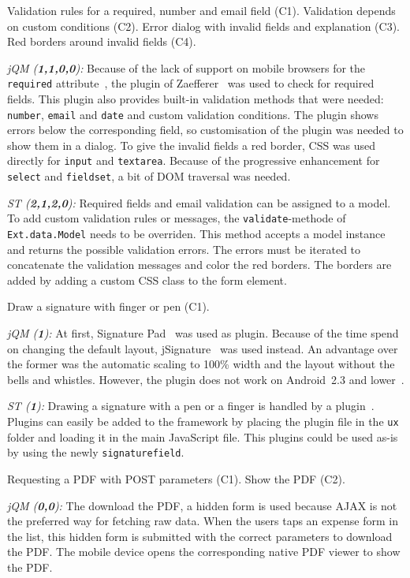 \documentclass[a4paper]{artikel3}
\newcommand{\code}[1]{\texttt{#1}}
\newcommand{\setspace}[0]{\vspace{2mm}}
\renewcommand{\paragraph}[1]{\setspace \noindent {\bf #1}  }
\newcommand{\framework}[2]{ \emph{#1 (\textbf{#2}): }} %
\newcommand{\challenge}[1]{\paragraph{#1}}
\begin{document}
\challenge{Form validation (C1,C2,C3,C4)}
Validation rules for a required, number and email field (C1).
Validation depends on custom conditions (C2).
Error dialog with invalid fields and explanation (C3).
Red borders around invalid fields (C4).

\framework{jQM}{1,1,0,0}
Because of the lack of support on mobile browsers for the \code{required} attribute~\cite{Deveria2013}, the plugin of Zaefferer~\cite{Zaefferer2013} was used to check for required fields.
This plugin also provides built-in validation methods that were needed: \code{number}, \code{email} and \code{date} and custom validation conditions.
The plugin shows errors below the corresponding field, so customisation of the plugin was needed to show them in a dialog.
To give the invalid fields a red border, CSS was used directly for \code{input} and \code{textarea}.
Because of the progressive enhancement for \code{select} and \code{fieldset}, a bit of DOM traversal was needed.

\framework{ST}{2,1,2,0}
Required fields and email validation can be assigned to a model.  
To add custom validation rules or messages,  the \code{validate}-methode of \code{Ext.data.Model} needs to be overriden.  
This method accepts a model instance and returns the possible validation errors.  
The errors must be iterated to concatenate the validation messages and color the red borders.
The borders are added by adding a custom CSS class to the form element.

\challenge{Signature (C1)}
Draw a signature with finger or pen (C1).

\framework{jQM}{1}
At first, Signature Pad~\cite{Bradley2013} was used as plugin.
Because of the time spend on changing the default layout, jSignature~\cite{Systems2013} was used instead.
An advantage over the former was the automatic scaling to 100\% width and the layout without the bells and whistles.
However, the plugin does not work on Android~2.3 and lower~\cite{Systems2013}.

\framework{ST}{1}
Drawing a signature with a pen or a finger is handled by a plugin~\cite{SimFla2011}.  
Plugins can easily be added to the framework by placing the plugin file in the \code{ux} folder and loading it in the main JavaScript file.  
This plugins could be used as-is by using the newly \code{signaturefield}.  

\challenge{Show PDF (C1,C2)}
Requesting a PDF with POST parameters (C1).
Show the PDF (C2).

\framework{jQM}{0,0}
The download the PDF, a hidden form is used because AJAX is not the preferred way for fetching raw data.
When the users taps an expense form in the list, this hidden form is submitted with the correct parameters to download the PDF.
The mobile device opens the corresponding native PDF viewer to show the PDF.
\end{document}
